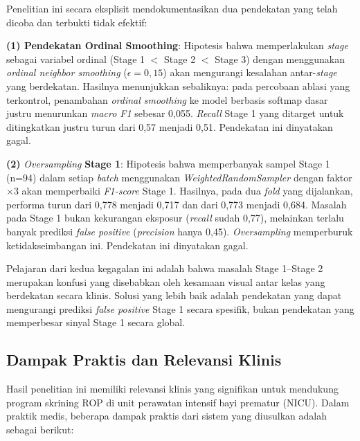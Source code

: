 Penelitian ini secara eksplisit mendokumentasikan dua pendekatan yang telah dicoba dan terbukti
tidak efektif:

\textbf{(1) Pendekatan Ordinal Smoothing}: Hipotesis bahwa memperlakukan \textit{stage} sebagai
variabel ordinal (Stage 1 $<$ Stage 2 $<$ Stage 3) dengan menggunakan \textit{ordinal neighbor
smoothing} ($\epsilon = 0{,}15$) akan mengurangi kesalahan antar-\textit{stage} yang
berdekatan. Hasilnya menunjukkan sebaliknya: pada percobaan ablasi yang terkontrol,
penambahan \textit{ordinal smoothing} ke model berbasis softmap dasar justru menurunkan \textit{macro F1} sebesar
0,055. \textit{Recall} Stage 1 yang ditarget untuk ditingkatkan justru turun dari 0,57 menjadi
0,51. Pendekatan ini dinyatakan gagal.

\textbf{(2)} \textit{Oversampling} \textbf{Stage 1}: Hipotesis bahwa memperbanyak sampel Stage 1 (n=94) dalam
setiap \textit{batch} menggunakan \textit{WeightedRandomSampler} dengan faktor $\times$3 akan
memperbaiki \textit{F1-score} Stage 1. Hasilnya, pada dua \textit{fold} yang dijalankan, performa turun dari
0,778 menjadi 0,717 dan dari 0,773 menjadi 0,684. Masalah pada Stage 1 bukan kekurangan
eksposur (\textit{recall} sudah 0,77), melainkan terlalu banyak prediksi \textit{false positive}
(\textit{precision} hanya 0,45). \textit{Oversampling} memperburuk ketidakseimbangan ini. Pendekatan
ini dinyatakan gagal.

Pelajaran dari kedua kegagalan ini adalah bahwa masalah Stage 1--Stage 2 merupakan konfusi
yang disebabkan oleh kesamaan visual antar kelas yang berdekatan secara klinis. Solusi yang
lebih baik adalah pendekatan yang dapat mengurangi prediksi \textit{false positive} Stage 1 secara
spesifik, bukan pendekatan yang memperbesar sinyal Stage 1 secara global.

\subsection{Dampak Praktis dan Relevansi Klinis}

Hasil penelitian ini memiliki relevansi klinis yang signifikan untuk mendukung program skrining ROP di unit perawatan intensif bayi prematur (NICU). Dalam praktik medis, beberapa dampak praktis dari sistem yang diusulkan adalah sebagai berikut:

